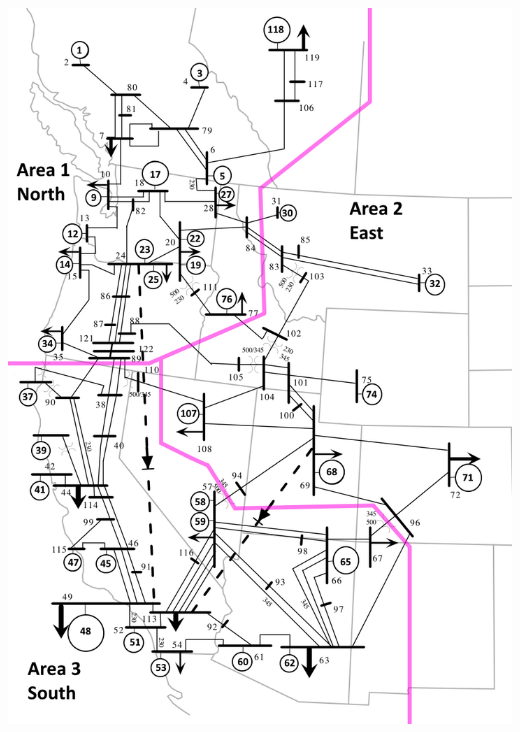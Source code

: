 \documentclass[12pt]{article}
\begin{document}
\begin{minipage}{0.47\linewidth}
\includegraphics[width=.9\linewidth]{miniWECC_split03.png}
\end{minipage}%
\end{document}
